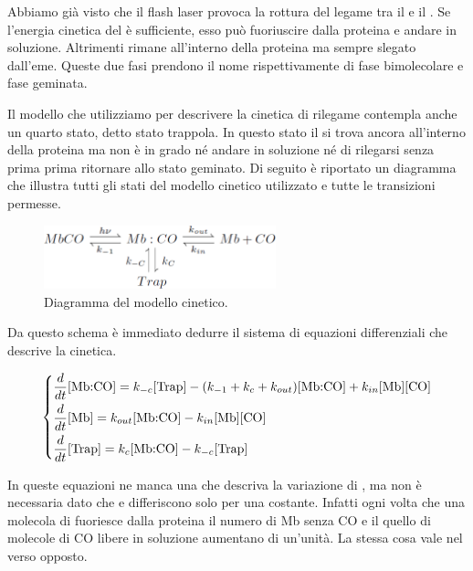 \documentclass[11pt, a4paper]{article}
\begin{document}

Abbiamo già visto che il flash laser provoca la rottura del legame tra il  e il . Se l'energia cinetica del  è sufficiente, esso può fuoriuscire dalla proteina e andare in soluzione.
Altrimenti rimane all'interno della proteina ma sempre slegato dall'eme. Queste due fasi prendono il nome rispettivamente di fase bimolecolare e fase geminata.

Il modello che utilizziamo per descrivere la cinetica di rilegame contempla anche un quarto stato, detto stato trappola. In questo stato il  si trova ancora all'interno della proteina ma non è in grado
né andare in soluzione né di rilegarsi senza prima prima ritornare allo stato geminato. Di seguito è riportato un diagramma che illustra
tutti gli stati del modello cinetico utilizzato e tutte le transizioni permesse.

\begin{figure}[H]
    \centering
    \includegraphics[width=0.6\textwidth]{kinetics_trimmed.png}
    \caption{Diagramma del modello cinetico.}
\end{figure}

Da questo schema è immediato dedurre il sistema di equazioni differenziali che descrive la cinetica.

\begin{equation}
    \begin{dcases}
        \frac{d}{dt} \ce{[Mb{:}CO]} = k_{-c} \ce{[Trap]} - (k_{-1} + k_c + k_{out}) \ce{[Mb{:}CO]} + k_{in} \ce{[Mb]}\ce{[CO]} \\
        \frac{d}{dt} \ce{[Mb]} = k_{out} \ce{[Mb{:}CO]} - k_{in} \ce{[Mb]}\ce{[CO]} \\
        \frac{d}{dt} \ce{[Trap]} = k_c \ce{[Mb{:}CO]} - k_{-c} \ce{[Trap]}
    \end{dcases}
    \label{kinetics_eqdiff}
\end{equation}

In queste equazioni ne manca una che descriva la variazione di \ce{[CO]}, ma non è necessaria dato che \ce{[Mb]} e \ce{[CO]} differiscono solo per una costante.
Infatti ogni volta che una molecola di  fuoriesce dalla proteina il numero di Mb senza CO e il quello di molecole di CO libere in soluzione aumentano di un'unità. La stessa cosa vale nel verso opposto.
\end{document}
